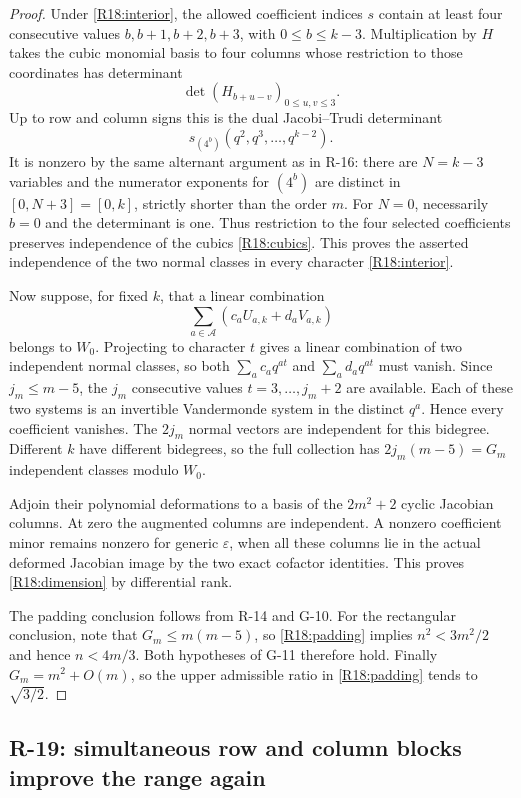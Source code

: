 \begin{proof}
Under \eqref{R18:interior}, the allowed coefficient
indices $s$ contain at least four consecutive values
$b,b+1,b+2,b+3$, with $0\leq b\leq k-3$.
Multiplication by $H$ takes the cubic monomial basis
to four columns whose restriction to those coordinates
has determinant
\[
 \det(H_{b+u-v})_{0\leq u,v\leq3}.
\]
Up to row and column signs this is the dual
Jacobi--Trudi determinant
\[
 s_{(4^b)}(q^2,q^3,\ldots,q^{k-2}).
\]
It is nonzero by the same alternant argument as in
R-16: there are $N=k-3$ variables and the numerator
exponents for $(4^b)$ are distinct in
$[0,N+3]=[0,k]$, strictly shorter than the order $m$.
For $N=0$, necessarily $b=0$ and the determinant is one.
Thus restriction to the four selected coefficients
preserves independence of the cubics
\eqref{R18:cubics}. This proves the asserted independence
of the two normal classes in every character
\eqref{R18:interior}.

Now suppose, for fixed $k$, that a linear combination
\[
 \sum_{a\in\mathcal A}
        (c_aU_{a,k}+d_aV_{a,k})
\]
belongs to $W_0$. Projecting to character $t$ gives a
linear combination of two independent normal classes,
so both $\sum_a c_aq^{at}$ and
$\sum_a d_aq^{at}$ must vanish.
Since $j_m\leq m-5$, the $j_m$ consecutive values
$t=3,\ldots,j_m+2$ are available. Each of these two
systems is an invertible Vandermonde system in the
distinct $q^a$. Hence every coefficient vanishes.
The $2j_m$ normal vectors are independent for this
bidegree. Different $k$ have different bidegrees, so
the full collection has $2j_m(m-5)=G_m$ independent
classes modulo $W_0$.

Adjoin their polynomial deformations to a basis of
the $2m^2+2$ cyclic Jacobian columns. At zero the
augmented columns are independent. A nonzero coefficient
minor remains nonzero for generic $\varepsilon$, when
all these columns lie in the actual deformed Jacobian
image by the two exact cofactor identities. This proves
\eqref{R18:dimension} by differential rank.

The padding conclusion follows from R-14 and G-10.
For the rectangular conclusion, note that
$G_m\leq m(m-5)$, so \eqref{R18:padding} implies
$n^2<3m^2/2$ and hence $n<4m/3$.
Both hypotheses of G-11 therefore hold.
Finally $G_m=m^2+O(m)$, so the upper admissible ratio
in \eqref{R18:padding} tends to $\sqrt{3/2}$.
\end{proof}


\subsection{R-19: simultaneous row and column blocks improve the range again}

